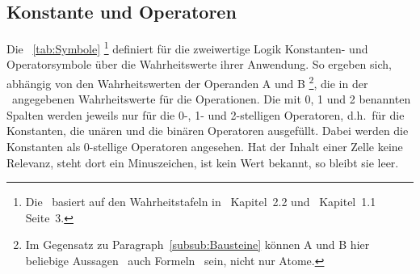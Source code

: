 \documentclass[english,ngerman,parskip=half,headsepline,footsepline]{scrreprt}
\makeatletter
\newcommand*{\subsubsectionname}{Paragraph}
\newcommand*{\textdh}{d.\@ h.\@}
\makeatother
\begin{document}
	\subsection{Konstante und Operatoren} %
	\label{sub:Operatoren}

	Die \tablename~\vref{tab:Symbole} \footnote{Die \tablename\ basiert auf den Wahrheitstafeln in~\cite{bib:Junktor} Kapitel~2.2 und~\cite{bib:Rautenberg} Kapitel~1.1 Seite~3.} definiert für die zweiwertige Logik Konstanten- und Operatorsymbole über die Wahrheitswerte ihrer Anwendung. So ergeben sich, abhängig von den Wahrheitswerten der Operanden A und B \footnote{Im Gegensatz zu \subsubsectionname~\vref{subsub:Bausteine} können A und B hier beliebige Aussagen \textendash\ auch Formeln \textendash\ sein, nicht nur Atome.}, die in der \tablename\ angegebenen Wahrheitswerte für die Operationen. Die mit 0, 1 und 2 benannten Spalten werden jeweils nur für die 0-, 1- und 2-stelligen Operatoren, \textdh\ für die Konstanten, die unären und die binären Operatoren ausgefüllt. Dabei werden die Konstanten als 0-stellige Operatoren angesehen. Hat der Inhalt einer Zelle keine Relevanz, steht dort ein Minuszeichen, ist kein Wert bekannt, so bleibt sie leer.
\end{document}
